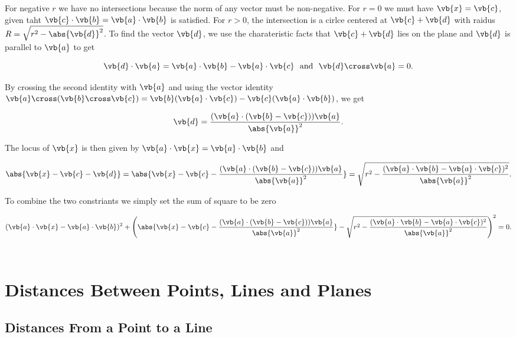 \documentclass[a4paper,12pt]{report}
\begin{document}
{For negative \(r\) we have no intersections because the norm of any vector must be non-negative. For \(r = 0\) we must have \(\vb{x} = \vb{c} \), given taht \(\vb{c} \cdot \vb{b} = \vb{a} \cdot \vb{b} \) is satisfied. For \(r > 0\), the intersection is a cirlce centered at \(\vb{c} + \vb{d} \) with raidus \(R = \sqrt{r^2 - \abs{\vb{d} }^2 } \). To find the vector \(\vb{d} \), we use the charateristic facts that \(\vb{c} + \vb{d} \) lies on the plane and \(\vb{d} \) is parallel to \(\vb{a} \) to get 

\begin{equation}
    \vb{d} \cdot \vb{a} = \vb{a} \cdot \vb{b} - \vb{a} \cdot \vb{c} ~\text { and }~ \vb{d} \cross \vb{a} = 0.
\end{equation}

By crossing the second identity with \(\vb{a} \) and using the vector identity \(\vb{a} \cross (\vb{b} \cross \vb{c} ) = \vb{b} (\vb{a} \cdot \vb{c} ) - \vb{c} (\vb{a} \cdot \vb{b}) \), we get 

\begin{equation}
    \vb{d} = \frac{(\vb{a} \cdot (\vb{b} -\vb{c} ))\vb{a} }{\abs{\vb{a} }^2 }. 
\end{equation}

The locus of \(\vb{x} \) is then given by \(\vb{a} \cdot \vb{x} = \vb{a} \cdot \vb{b} \) and 

\begin{equation}
    \abs{\vb{x} -\vb{c} -\vb{d} } =  \abs{\vb{x} -\vb{c} - \frac{(\vb{a} \cdot (\vb{b} -\vb{c} ))\vb{a} }{\abs{\vb{a} }^2 } } = \sqrt{r^2 - \frac{(\vb{a} \cdot \vb{b} - \vb{a} \cdot \vb{c} )^2}{\abs{\vb{a} }^2 } }.
\end{equation}

To combine the two constriants we simply set the sum of square to be zero 

\begin{equation}
    (\vb{a} \cdot \vb{x} -\vb{a} \cdot \vb{b} )^2 + \left( \abs{\vb{x} -\vb{c} - \frac{(\vb{a} \cdot (\vb{b} -\vb{c} ))\vb{a} }{\abs{\vb{a} }^2 } } - \sqrt{r^2 - \frac{(\vb{a} \cdot \vb{b} - \vb{a} \cdot \vb{c} )^2}{\abs{\vb{a} }^2 } } \right)^2 = 0.
\end{equation}
~
} 


\section{Distances Between Points, Lines and Planes}

\subsection{Distances From a Point to a Line}
\end{document}
